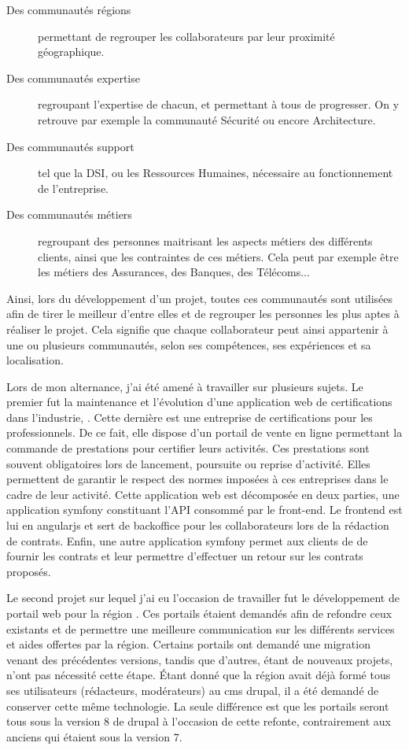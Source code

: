 \begin{description}
	\item [Des communautés régions] permettant de regrouper les collaborateurs par leur proximité géographique.
	\item [Des communautés expertise] regroupant l'expertise de chacun, et permettant à tous de progresser. On y retrouve par exemple la communauté Sécurité ou encore Architecture.
	\item [Des communautés support] tel que la \gls{DSI}, ou les Ressources Humaines, nécessaire au fonctionnement de l'entreprise.
	\item [Des communautés métiers] regroupant des personnes maitrisant les aspects métiers des différents clients, ainsi que les contraintes de ces métiers. Cela peut par exemple être les métiers des Assurances, des Banques, des Télécoms... 
\end{description}

Ainsi, lors du développement d'un projet, toutes ces communautés sont utilisées afin de tirer le meilleur d'entre elles et de regrouper les personnes les plus aptes à réaliser le projet. Cela signifie que chaque collaborateur peut ainsi appartenir à une ou plusieurs communautés, selon ses compétences, ses expériences et sa localisation. 

Lors de mon alternance, j'ai été amené à travailler sur plusieurs sujets. Le premier fut la maintenance et l'évolution d'une application web de certifications dans l'industrie, \bv. Cette dernière est une entreprise de certifications pour les professionnels. De ce fait, elle dispose d’un portail de vente en ligne permettant la commande de prestations pour certifier leurs activités. Ces prestations sont souvent obligatoires lors de lancement, poursuite ou reprise d'activité. Elles permettent de garantir le respect des normes imposées à ces entreprises dans le cadre de leur activité. Cette application web est décomposée en deux parties, une application \gls{symfony} constituant l'\gls{API} consommé par le front-end. Le \gls{frontend} est lui en \gls{angularjs} et sert de \gls{backoffice} pour les collaborateurs \bv{} lors de la rédaction de contrats. Enfin, une autre application \gls{symfony} permet aux clients de \bv{} de fournir les contrats et leur permettre d'effectuer un retour sur les contrats proposés.

Le second projet sur lequel j'ai eu l'occasion de travailler fut le développement de portail web pour la région \naq{}. Ces portails étaient demandés afin de refondre ceux existants et de permettre une meilleure communication sur les différents services et aides offertes par la région. Certains portails ont demandé une migration venant des précédentes versions, tandis que d'autres, étant de nouveaux projets, n'ont pas nécessité cette étape. Étant donné que la région avait déjà formé tous ses utilisateurs (rédacteurs, modérateurs) au \gls{cms} \gls{drupal}, il a été demandé de conserver cette même technologie. La seule différence est que les portails seront tous sous la version 8 de \gls{drupal} à l'occasion de cette refonte, contrairement aux anciens qui étaient sous la version 7. 

